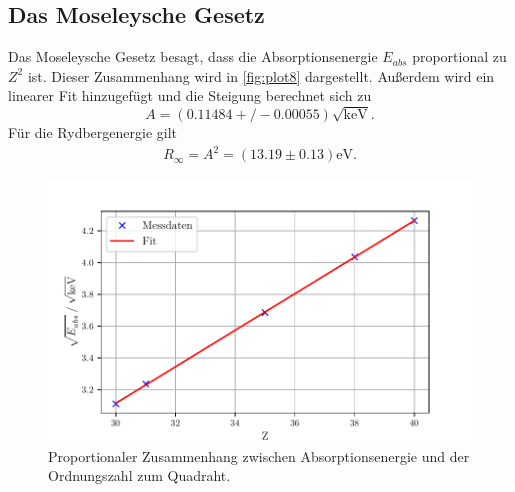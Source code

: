 \subsection{Das Moseleysche Gesetz} %
\label{sub:Das Moseleysche Gesetz}
Das Moseleysche Gesetz besagt, dass die Absorptionsenergie $E_{abs}$ proportional zu $Z^2$ ist.
Dieser Zusammenhang wird in \autoref{fig:plot8} dargestellt. Außerdem wird ein linearer Fit hinzugefügt
und die Steigung berechnet sich zu
\begin{equation}
  A = (0.11484+/-0.00055) \sqrt{\si{\kilo\electronvolt}}.
\end{equation}
Für die Rydbergenergie gilt
\begin{align}
  R_{\infty} = A^2 = (13.19 \pm 0.13) \si{\electronvolt}.
\end{align}

\begin{figure}[H]
  \centering
  \includegraphics[width=\textwidth]{build/plot8.pdf}
  \caption{Proportionaler Zusammenhang zwischen Absorptionsenergie und der Ordnungszahl zum Quadraht.}
  \label{fig:plot8}
\end{figure}

